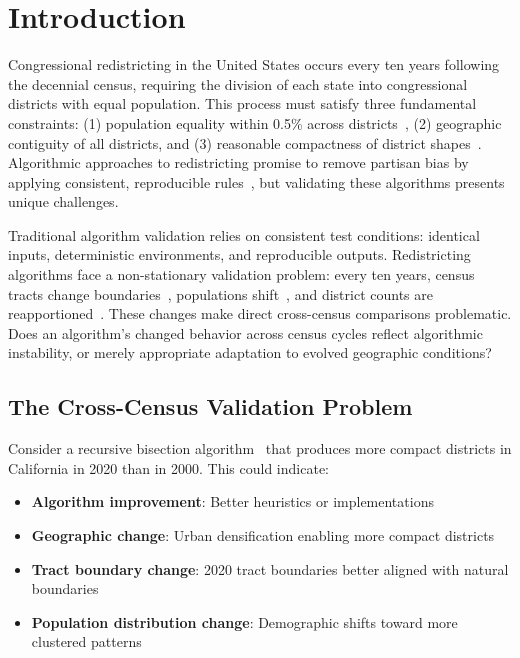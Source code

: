 \section{Introduction}

Congressional redistricting in the United States occurs every ten years following the decennial census, requiring the division of each state into congressional districts with equal population. This process must satisfy three fundamental constraints: (1) population equality within 0.5\% across districts~\cite{karcher1983}, (2) geographic contiguity of all districts, and (3) reasonable compactness of district shapes~\cite{polsby1991}. Algorithmic approaches to redistricting promise to remove partisan bias by applying consistent, reproducible rules~\cite{altman1998}, but validating these algorithms presents unique challenges.

Traditional algorithm validation relies on consistent test conditions: identical inputs, deterministic environments, and reproducible outputs. Redistricting algorithms face a non-stationary validation problem: every ten years, census tracts change boundaries~\cite{schroeder2007}, populations shift~\cite{frey2001}, and district counts are reapportioned~\cite{balinski1982}. These changes make direct cross-census comparisons problematic. Does an algorithm's changed behavior across census cycles reflect algorithmic instability, or merely appropriate adaptation to evolved geographic conditions?

\subsection{The Cross-Census Validation Problem}

Consider a recursive bisection algorithm~\cite{dellaLibera2026recursive} that produces more compact districts in California in 2020 than in 2000. This could indicate:
\begin{itemize}
    \item \textbf{Algorithm improvement}: Better heuristics or implementations
    \item \textbf{Geographic change}: Urban densification enabling more compact districts
    \item \textbf{Tract boundary change}: 2020 tract boundaries better aligned with natural boundaries
    \item \textbf{Population distribution change}: Demographic shifts toward more clustered patterns
\end{itemize}

